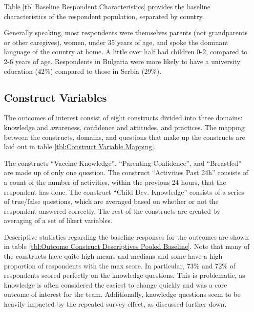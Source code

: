 \documentclass{article}
\begin{document}
Table \ref{tbl:Baseline Respondent Characteristics} provides the baseline characteristics of the respondent population, separated by country.

Generally speaking, most respondents were themselves parents (not grandparents or other caregives), women, under 35 years of age, and spoke the dominant language of the country at home. A little over half had children 0-2, compared to 2-6 years of age. Respondents in Bulgaria were more likely to have a university education (42\%) compared to those in Serbia (29\%).



\subsection*{Construct Variables}

The outcomes of interest consist of eight constructs divided into three domains: knowledge and awareness, confidence and attitudes, and practices. The mapping between the constructs, domains, and questions that make up the constructs are laid out in table \ref{tbl:Construct Variable Mapping}.

The constructs ``Vaccine Knowledge'', ``Parenting Confidence'', and ``Breastfed'' are made up of only one question. The construct ``Activities Past 24h'' consists of a count of the number of activities, within the previous 24 hours, that the respondent has done. The construct ``Child Dev. Knowledge'' consists of a series of true/false questions, which are averaged based on whether or not the respondent answered correctly. The rest of the constructs are created by averaging of a set of likert variables.

Descriptive statistics regarding the baseline responses for the outcomes are shown in table \ref{tbl:Outcome Construct Descriptives Pooled Baseline}. Note that many of the constructs have quite high means and medians and some have a high proportion of respondents with the max score. In particular, 73\% and 72\% of respondents scored perfectly on the knowledge questions. This is problematic, as knowledge is often considered the easiest to change quickly and was a core outcome of interest for the team. Additionally, knowledge questions seem to be heavily impacted by the repeated survey effect, as discussed further down.

\end{document}
